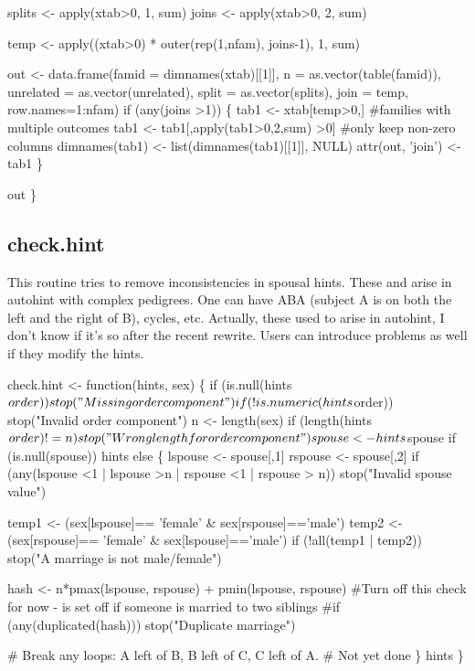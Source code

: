 \documentclass{article}
\begin{document}
    splits <- apply(xtab>0, 1, sum)
    joins  <- apply(xtab>0, 2, sum)

    temp <- apply((xtab>0) * outer(rep(1,nfam), joins-1), 1, sum)

    out <- data.frame(famid = dimnames(xtab)[[1]],
                      n = as.vector(table(famid)),
                      unrelated = as.vector(unrelated),
                      split = as.vector(splits),
                      join = temp,
                      row.names=1:nfam)
    if (any(joins >1)) \{
      tab1 <- xtab[temp>0,]  #families with multiple outcomes
      tab1 <- tab1[,apply(tab1>0,2,sum) >0] #only keep non-zero columns
      dimnames(tab1) <- list(dimnames(tab1)[[1]], NULL)
      attr(out, 'join') <- tab1
    \}
    
    out
  \}


\nwendcode{}\nwdocspar


\subsection{check.hint}
This routine tries to remove inconsistencies in spousal hints.
These and arise in autohint with complex pedigrees.
One can have ABA (subject A is on both the
left and the right of B), cycles, etc. 
Actually, these used to arise in autohint, I don't know if it's so
after the recent rewrite.
Users can introduce problems as well if they modify the hints.

\nwenddocs{}\endmoddef
check.hint <- function(hints, sex) \{
    if (is.null(hints$order)) stop("Missing order component")
    if (!is.numeric(hints$order)) stop("Invalid order component")
    n <- length(sex)
    if (length(hints$order) != n) stop("Wrong length for order component")
    
    spouse <- hints$spouse
    if (is.null(spouse)) hints
    else \{
        lspouse <- spouse[,1]
        rspouse <- spouse[,2]
        if (any(lspouse <1 | lspouse >n | rspouse <1 | rspouse > n))
            stop("Invalid spouse value")
        
        temp1 <- (sex[lspouse]== 'female' & sex[rspouse]=='male')
        temp2 <- (sex[rspouse]== 'female' & sex[lspouse]=='male')
        if (!all(temp1 | temp2))
            stop("A marriage is not male/female")
        
        hash <- n*pmax(lspouse, rspouse) + pmin(lspouse, rspouse)
        #Turn off this check for now - is set off if someone is married to two siblings
        #if (any(duplicated(hash))) stop("Duplicate marriage")

        # Break any loops: A left of B, B left of C, C left of A.
        #  Not yet done 
      \}
    hints
  \}
\nwendcode{}\nwdocspar
\end{document}
